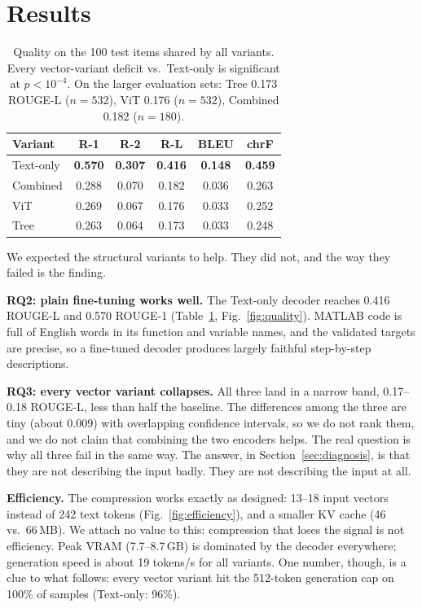 \documentclass[conference]{IEEEtran}
\begin{document}
\section{Results}
\label{sec:results}

\begin{table}[t]
\centering
\caption{Quality on the 100 test items shared by all variants. Every vector-variant deficit vs.\ Text-only is significant at $p < 10^{-4}$. On the larger evaluation sets: Tree 0.173 ROUGE-L ($n{=}532$), ViT 0.176 ($n{=}532$), Combined 0.182 ($n{=}180$).}
\label{tab:results}
\begin{tabular}{lccccc}
\toprule
Variant & R-1 & R-2 & R-L & BLEU & chrF \\
\midrule
Text-only & \textbf{0.570} & \textbf{0.307} & \textbf{0.416} & \textbf{0.148} & \textbf{0.459} \\
Combined  & 0.288 & 0.070 & 0.182 & 0.036 & 0.263 \\
ViT       & 0.269 & 0.067 & 0.176 & 0.033 & 0.252 \\
Tree      & 0.263 & 0.064 & 0.173 & 0.033 & 0.248 \\
\bottomrule
\end{tabular}
\end{table}

We expected the structural variants to help. They did not, and the way they failed is the finding.

\textbf{RQ2: plain fine-tuning works well.} The Text-only decoder reaches 0.416 ROUGE-L and 0.570 ROUGE-1 (Table~\ref{tab:results}, Fig.~\ref{fig:quality}). MATLAB code is full of English words in its function and variable names, and the validated targets are precise, so a fine-tuned decoder produces largely faithful step-by-step descriptions.

\textbf{RQ3: every vector variant collapses.} All three land in a narrow band, 0.17--0.18 ROUGE-L, less than half the baseline. The differences among the three are tiny (about 0.009) with overlapping confidence intervals, so we do not rank them, and we do not claim that combining the two encoders helps. The real question is why all three fail in the same way. The answer, in Section~\ref{sec:diagnosis}, is that they are not describing the input badly. They are not describing the input at all.

\textbf{Efficiency.} The compression works exactly as designed: 13--18 input vectors instead of 242 text tokens (Fig.~\ref{fig:efficiency}), and a smaller KV cache (46 vs.\ 66\,MB). We attach no value to this: compression that loses the signal is not efficiency. Peak VRAM (7.7--8.7\,GB) is dominated by the decoder everywhere; generation speed is about 19 tokens/s for all variants. One number, though, is a clue to what follows: every vector variant hit the 512-token generation cap on 100\% of samples (Text-only: 96\%).
\end{document}
